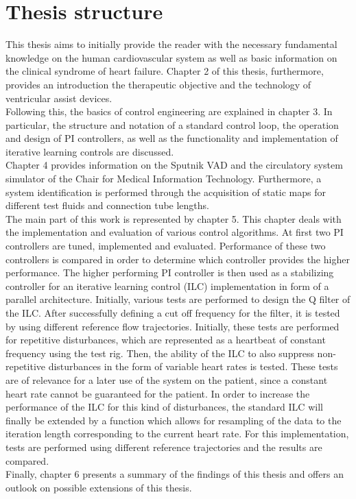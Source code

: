 \section{Thesis structure}
This thesis aims to initially provide the reader with the necessary fundamental knowledge on the human cardiovascular system as well as basic information on the clinical syndrome of heart failure. Chapter 2 of this thesis, furthermore, provides an introduction the therapeutic objective and the technology of ventricular assist devices.
\\Following this, the basics of control engineering are explained in chapter 3. In particular, the structure and notation of a standard control loop, the operation and design of PI controllers, as well as the functionality and implementation of iterative learning controls are discussed.
\\Chapter 4 provides information on the Sputnik VAD and the circulatory system simulator of the Chair for Medical Information Technology. Furthermore, a system identification is performed through the acquisition of static maps for different test fluids and connection tube lengths.
\\The main part of this work is represented by chapter 5. This chapter deals with the implementation and evaluation of various control algorithms. At first two PI controllers are tuned, implemented and evaluated. Performance of these two controllers is compared in order to determine which controller provides the higher performance. The higher performing PI controller is then used as a stabilizing controller for an iterative learning control (ILC) implementation in form of a parallel architecture. Initially, various tests are performed to design the Q filter of the ILC. After successfully defining a cut off frequency for the filter, it is tested by using different reference flow trajectories. Initially, these tests are performed for repetitive disturbances, which are represented as a heartbeat of constant frequency using the test rig. Then, the ability of the ILC to also suppress non-repetitive disturbances in the form of variable heart rates is tested. These tests are of relevance for a later use of the system on the patient, since a constant heart rate cannot be guaranteed for the patient. In order to increase the performance of the ILC for this kind of disturbances, the standard ILC will finally be extended by a function which allows for resampling of the data to the iteration length corresponding to the current heart rate. For this implementation, tests are performed using different reference trajectories and the results are compared.
\\Finally, chapter 6 presents a summary of the findings of this thesis and offers an outlook on possible extensions of this thesis.
